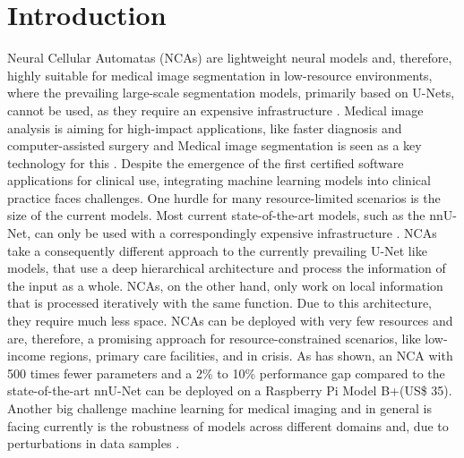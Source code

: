 \chapter{Introduction}  
\label{introduction}
Neural Cellular Automatas (NCAs) are lightweight neural models and, therefore, highly suitable for medical image segmentation in low-resource environments, where the prevailing large-scale segmentation models, primarily based on U-Nets, cannot be used, as they require an expensive infrastructure \cite{kalkhof:2023:M3D-NCA}. 
Medical image analysis is aiming for high-impact applications, like faster diagnosis and computer-assisted surgery \cite{Isensee:2021:nnU-Net, Maier-Hain:2018:BioMedAnalysisOverview/Ranking} and Medical image segmentation is seen as a key technology for this \cite{Maier-Hain:2018:BioMedAnalysisOverview/Ranking}. Despite the emergence of the first certified software applications for clinical use, integrating machine learning models into clinical practice faces challenges. One hurdle for many resource-limited scenarios is the size of the current models. Most current state-of-the-art models, such as the nnU-Net, can only be used with a correspondingly expensive infrastructure \cite{Varaquaux:2022:medMLFailuresFuture, kalkhof:2023:M3D-NCA}. NCAs take a consequently different approach to the currently prevailing U-Net like models, that use a deep hierarchical architecture and process the information of the input as a whole. NCAs, on the other hand, only work on local information that is processed iteratively with the same function. Due to this architecture, they require much less space. NCAs can be deployed with very few resources and are, therefore, a promising approach for resource-constrained scenarios, like low-income regions, primary care facilities, and in crisis. As \cite{kalkhof:2023:medNCA} has shown, an NCA with 500 times fewer parameters and a 2\% to 10\% performance gap compared to the state-of-the-art nnU-Net can be deployed on a Raspberry Pi Model B+(US\$ 35).\\
Another big challenge machine learning for medical imaging and in general is facing currently is the robustness of models across different domains and, due to perturbations in data samples \cite{Yan:2019:DomainShiftsInMedSeg, Zhou:2023:DomainGeneralization_alsoAugmentation}. 
